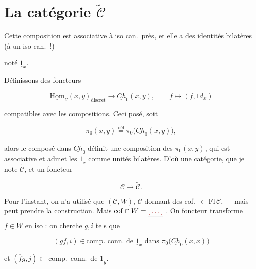 \documentclass[11pt,a4paper]{article}
\begin{document}
\section{La catégorie $\widetilde{\mathcal{C}}$}



Cette composition est associative à iso can.\ près, et elle a des identités
bilatères (à un iso can.\ !) \ill{}


noté $\underline{1}_x$.

 Définissons  des foncteurs

\[
\underline{\mathrm{Hom}}_{\mathcal{C}}(x,y)_{\text{discret}}
\longrightarrow \underline{Ch}_0(x,y),
\qquad f \longmapsto (f, 1d_x)
\]


 compatibles avec les compositions. Ceci posé, soit

\[
\pi_0(x,y) \overset{\text{déf}}{=} \pi_0\bigl(\underline{Ch}_0(x,y)\bigr),
\]

alors le composé dans $\underline{Ch}_0$ définit une composition des
$\pi_0(x,y)$, qui est associative \ill{} et admet les $\underline{1}_x$ comme
unités bilatères. D'où une catégorie, que je note $\widetilde{\mathcal{C}}$,
et un foncteur

\[
\mathcal{C} \longrightarrow \widetilde{\mathcal{C}}.
\]

Pour l'instant, on n'a utilisé  que $(\mathcal{C}, W)$,
 \ill{} $\mathcal{C}$ donnant des cof.\ $\subset
\mathrm{Fl}\,\mathcal{C}$,  \ill{}
 — mais \ill{} peut prendre la
construction. Mais $\mathrm{cof} \cap W = \struck{\ill{}}$ \ill{}. On \ill{}
foncteur transforme $f \in W$ en iso : on cherche $g, i$ tels que

\[
(gf, i) \in \text{comp.\ conn.\ de } \underline{1}_x
\text{ dans } \pi_0\bigl(\underline{Ch}_0(x,x)\bigr)
\]

et $(\overline{f}g, j) \in$ comp.\ conn.\ de $\underline{1}_y$.
\end{document}
